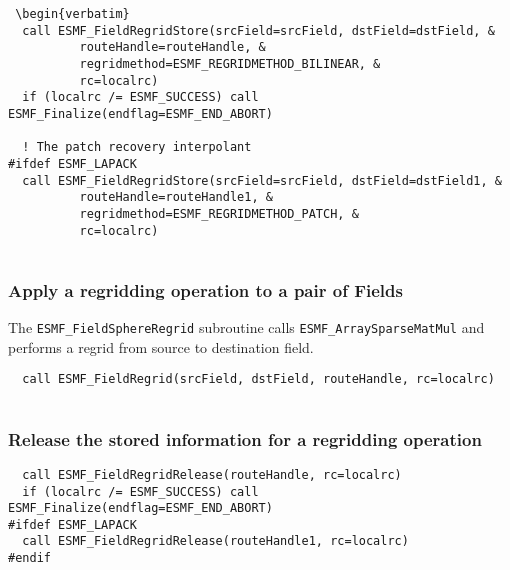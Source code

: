 \begin{verbatim}
 \begin{verbatim}
  call ESMF_FieldRegridStore(srcField=srcField, dstField=dstField, &
          routeHandle=routeHandle, &
          regridmethod=ESMF_REGRIDMETHOD_BILINEAR, &
          rc=localrc)
  if (localrc /= ESMF_SUCCESS) call ESMF_Finalize(endflag=ESMF_END_ABORT)

  ! The patch recovery interpolant
#ifdef ESMF_LAPACK
  call ESMF_FieldRegridStore(srcField=srcField, dstField=dstField1, &
          routeHandle=routeHandle1, &
          regridmethod=ESMF_REGRIDMETHOD_PATCH, &
          rc=localrc)
 
\end{verbatim}
 

  
  \subsubsection{Apply a regridding operation to a pair of Fields}
   The {\tt ESMF\_FieldSphereRegrid} subroutine calls {\tt ESMF\_ArraySparseMatMul}
   and performs a regrid from source to destination field. 

 \begin{verbatim}
  call ESMF_FieldRegrid(srcField, dstField, routeHandle, rc=localrc)
 
\end{verbatim}
 

   
  \subsubsection{Release the stored information for a regridding operation} 

 \begin{verbatim}
  call ESMF_FieldRegridRelease(routeHandle, rc=localrc)
  if (localrc /= ESMF_SUCCESS) call ESMF_Finalize(endflag=ESMF_END_ABORT)
#ifdef ESMF_LAPACK
  call ESMF_FieldRegridRelease(routeHandle1, rc=localrc)
#endif
 
\end{verbatim}

\setlength{\parskip}{\oldparskip}
\setlength{\parindent}{\oldparindent}
\setlength{\baselineskip}{\oldbaselineskip}
